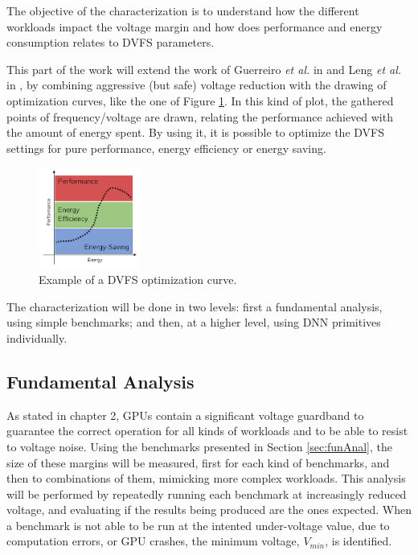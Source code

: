 The objective of the characterization is to understand how the different workloads impact the voltage margin and how does performance and energy consumption relates to DVFS parameters. 

This part of the work will extend the work of Guerreiro \textit{et al.} in \cite{guerreiro_gpgpu_2018} \cite{guerreiro_modeling_2019} and Leng \textit{et al.} in \cite{leng_safe_2015}, by combining aggressive (but safe) voltage reduction with the
drawing of optimization curves, like the one of Figure \ref{fig:optcurves}. In this kind of plot, the gathered points of frequency/voltage are drawn, relating the performance achieved with the amount of energy spent. By using it, it is possible to optimize the DVFS settings for pure performance, energy efficiency or energy saving.

\begin{figure}[!htb]
  \centering
  \includegraphics[width=0.3\textwidth]{Figures/Proposel/curves.png}
  \caption[Controller]{Example of a DVFS optimization curve.}
  \label{fig:optcurves}
\end{figure}

The characterization will be done in two levels: first a fundamental analysis, using simple benchmarks; and then, at a higher level, using DNN primitives individually.

\subsection{Fundamental Analysis}
\label{sec:funAnali}
As stated in chapter 2, GPUs contain a significant voltage guardband to guarantee the correct operation for all kinds of workloads and to be able to resist to voltage noise. Using the benchmarks presented in Section \ref{sec:funAnal}, the size of these margins will be measured, first for each kind of benchmarks, and then to combinations of them, mimicking more complex workloads. This analysis will be performed by repeatedly running each benchmark at increasingly reduced voltage, and evaluating if the results being produced are the ones expected. When a benchmark is not able to be run at the intented under-voltage value, due to computation errors, or GPU crashes, the minimum voltage, $V_{min}$, is identified.

